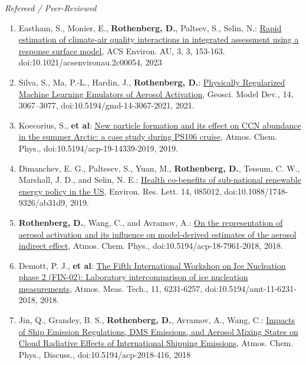 \documentclass[11pt,letterpaper]{article}
\begin{document}
 \bigskip
 \emph{Refereed / Peer-Reviewed}
 \medskip
 \begin{enumerate}[itemindent=-10pt]

 \item Eastham, S., Monier, E., \textbf{Rothenberg, D.}, Paltsev, S., Selin, N.: \href{https://pubs.acs.org/doi/10.1021/acsenvironau.2c00054}{Rapid estimation of climate-air quality interactions in integrated assessment using a response surface model}, ACS Environ. AU, 3, 3, 153-163. doi:10.1021/acsenvironau.2c00054, 2023

 \item Silva, S., Ma, P.-L., Hardin, J., \textbf{Rothenberg, D.}: \href{https://doi.org/10.5194/gmd-14-3067-2021}{Physically Regularized Machine Learning Emulators of Aerosol Activation}, Geosci. Model Dev., 14, 3067–3077, doi:10.5194/gmd-14-3067-2021, 2021.

 \item Koecorius, S., \textbf{et al}: \href{https://doi.org/10.5194/acp-19-14339-2019}{New particle formation and its effect on CCN abundance in the summer Arctic: a case study during PS106 cruise}, Atmos. Chem. Phys., doi:10.5194/acp-19-14339-2019, 2019.

 \item Dimanchev, E. G., Paltesev, S., Yuan, M., \textbf{Rothenberg, D.}, Tessum, C. W., Marshall, J. D., and Selin, N. E.: \href{https://doi.org/10.1088/1748-9326/ab31d9}{Health co-benefits of sub-national renewable energy policy in the US}, Environ. Res. Lett. 14, 085012, doi:10.1088/1748-9326/ab31d9, 2019.

 \item \textbf{Rothenberg, D.}, Wang, C., and Avramov, A.: \href{http://doi.org/10.5194/acp-18-7961-2018}{On the representation of aerosol activation and its influence on model-derived estimates of the aerosol indirect effect}, Atmos. Chem. Phys., doi:10.5194/acp-18-7961-2018, 2018.

 \item Demott, P. J., \textbf{et al}: \href{https://doi.org/10.5194/amt-11-6231-2018}{The Fifth International Workshop on Ice Nucleation phase 2 (FIN-02): Laboratory intercomparison of ice nucleation measurements}, Atmos. Meas. Tech., 11, 6231-6257, doi:10.5194/amt-11-6231-2018, 2018.

 \item Jin, Q., Grandey, B. S., \textbf{Rothenberg, D.}, Avramov, A., Wang, C.: \href{https://doi.org/10.5194/acp-2018-416}{Impacts of Ship Emission Regulations, DMS Emissions, and Aerosol Mixing States on Cloud Radiative Effects of International Shipping Emissions}, Atmos. Chem. Phys., Discuss., doi:10.5194/acp-2018-416, 2018


\end{enumerate}
\end{document}
